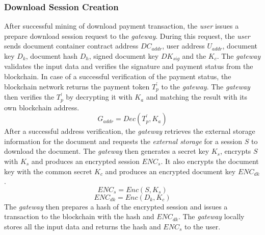 \documentclass[conference]{IEEEtran}
\begin{document}
\subsubsection{Download Session Creation}
After successful mining of download payment transaction, the {\it user} issues a prepare download session request to the {\it gateway}. During this request, the {\it user} sends document container contract address $DC_{addr}$, user address $U_{addr}$, document key $D_k$, document hash $D_h$, signed document key $DK_{sig}$ and the $K_c$. The {\it gateway} validates the input data and verifies the signature and payment status from the blockchain. In case of a successful verification of the payment status, the blockchain network returns the payment token $T_p^\prime$ to the {\it gateway}. The {\it gateway} then verifies the $T_p^\prime$ by decrypting it with $K_a$ and matching the result with its own blockchain address. 
\begin{equation}
\label{eq-d-3}
G_{addr} = Dec (T_p^\prime, K_a)
\end{equation}
After a successful address verification, the {\it gateway} retrieves the external storage information for the document and requests the {\it external storage} for a session $S$ to download the document. The {\it gateway} then generates a secret key $K_s$,  encrypts $S$ with $K_s$ and produces an encrypted session $ENC_s$. It also encrypts the document key with the common secret $K_c$ and produces an encrypted document key $ENC_{dk}$. 
\begin{equation}
\label{eq-d-4} 
ENC_s = Enc (S, K_s)
\end{equation}
\begin{equation}
\label{eq-d-5} 
ENC_{dk} = Enc (D_k, K_c)
\end{equation}
The {\it gateway} then prepares a hash of the encrypted session and issues a transaction to the blockchain with the hash and $ENC_{dk}$. The {\it gateway} locally stores all the input data and returns the hash and $ENC_s$ to the user.
\end{document}

